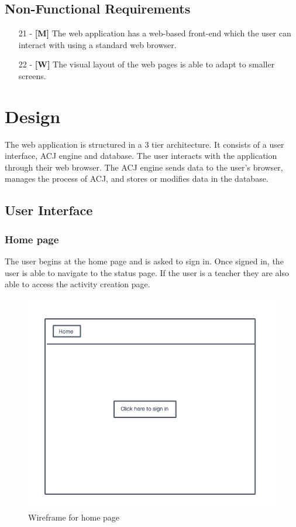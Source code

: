 \documentclass{l4proj}
\begin{document}
\section{Non-Functional Requirements}
\begin{itemize}
    \item
        [21] - \textbf{[M]} The web application has a web-based front-end which the user can interact with using a standard web browser.
    \item
        [22] - \textbf{[W]} The visual layout of the web pages is able to adapt to smaller screens.
\end{itemize}
\chapter{Design}
The web application is structured in a 3 tier architecture. It consists of a user interface, ACJ engine and database. The user interacts with the application through their web browser. The ACJ engine sends data to the user’s browser, manages the process of ACJ, and stores or modifies data in the database.

\section{User Interface}

\subsection{Home page}
The user begins at the home page and is asked to sign in. Once signed in, the user is able to navigate to the status page. If the user is a teacher they are also able to access the activity creation page.

\begin{figure}[h]
\begin{center}
    \includegraphics[width=0.65\linewidth]{images/w-home.png}    
    \caption{Wireframe for home page}
\end{center}
\end{figure}
\end{document}
